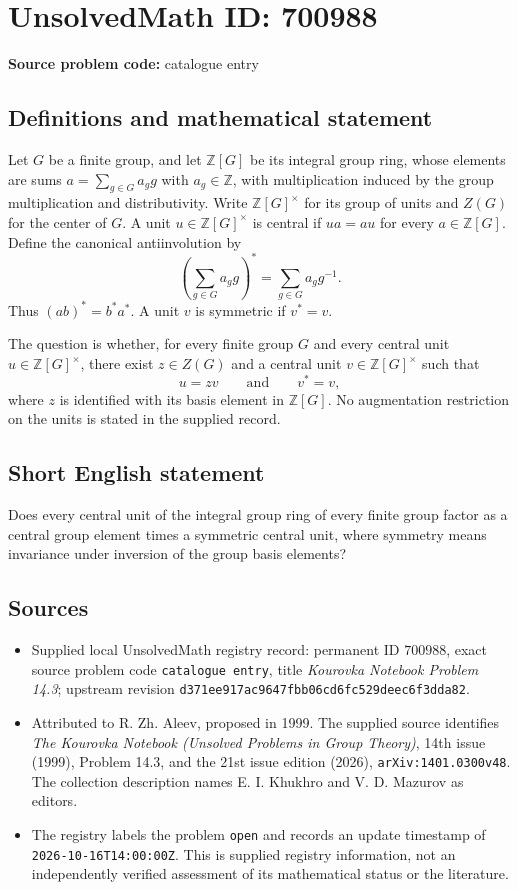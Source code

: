 \documentclass[11pt]{article}
\newcommand{\Z}{\mathbb{Z}}
\begin{document}
\section*{UnsolvedMath ID: 700988}
\textbf{Source problem code:} catalogue entry
\subsection{Definitions and mathematical statement}
Let \(G\) be a finite group, and let \(\Z[G]\) be its integral group ring, whose elements are sums \(a=\sum_{g\in G}a_g g\) with \(a_g\in\Z\), with multiplication induced by the group multiplication and distributivity. Write \(\Z[G]^\times\) for its group of units and \(Z(G)\) for the center of \(G\). A unit \(u\in\Z[G]^\times\) is central if \(ua=au\) for every \(a\in\Z[G]\). Define the canonical antiinvolution by
\[
\left(\sum_{g\in G}a_g g\right)^*=\sum_{g\in G}a_g g^{-1}.
\]
Thus \((ab)^*=b^*a^*\). A unit \(v\) is symmetric if \(v^*=v\).

The question is whether, for every finite group \(G\) and every central unit \(u\in\Z[G]^\times\), there exist \(z\in Z(G)\) and a central unit \(v\in\Z[G]^\times\) such that
\[
u=zv\qquad\text{and}\qquad v^*=v,
\]
where \(z\) is identified with its basis element in \(\Z[G]\). No augmentation restriction on the units is stated in the supplied record.
\subsection{Short English statement}
Does every central unit of the integral group ring of every finite group factor as a central group element times a symmetric central unit, where symmetry means invariance under inversion of the group basis elements?
\subsection{Sources}
\begin{itemize}
\item Supplied local UnsolvedMath registry record: permanent ID \(700988\), exact source problem code \texttt{catalogue entry}, title \emph{Kourovka Notebook Problem 14.3}; upstream revision \texttt{d371ee917ac9647fbb06cd6fc529deec6f3dda82}.
\item Attributed to R. Zh. Aleev, proposed in 1999. The supplied source identifies \emph{The Kourovka Notebook (Unsolved Problems in Group Theory)}, 14th issue (1999), Problem 14.3, and the 21st issue edition (2026), \texttt{arXiv:1401.0300v48}. The collection description names E. I. Khukhro and V. D. Mazurov as editors.
\item The registry labels the problem \texttt{open} and records an update timestamp of \texttt{2026-10-16T14:00:00Z}. This is supplied registry information, not an independently verified assessment of its mathematical status or the literature.
\end{itemize}
\end{document}
